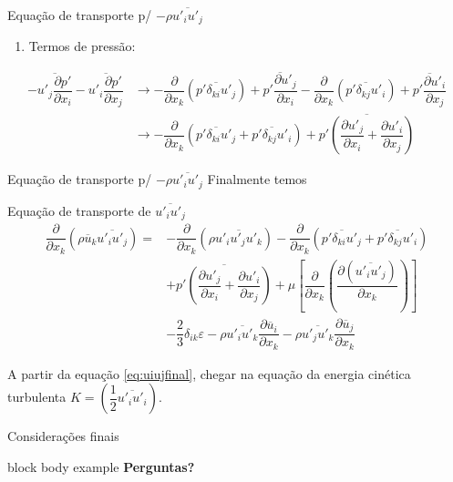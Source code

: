 \documentclass[10pt]{beamer}
\newcommand{\ddx}[2]{\dfrac{\partial #1}{\partial x_{#2}}}
\newcommand{\ddxp}[2]{\dfrac{\partial }{\partial x_{#2}}\left(#1\right)}
\newcommand{\m}[1]{\overline{#1}}
\begin{document}
\begin{frame}{Equação de transporte p/ $ -\rho \m{u'_i u'_j} $}
	\begin{enumerate}[$\bullet$]
		\item Termos de pressão:
	\end{enumerate}

	\begin{align*}
	- \m{u'_j\ddx{p'}{i}} - \m{u'_i\ddx{p'}{j}} 
	&\rightarrow - \ddxp{\m{p' \delta_{ki} u'_j}}{k} + \m{p'\ddx{u'_j}{i}} - \ddxp{\m{p' \delta_{kj} u'_i}}{k} + \m{p'\ddx{u'_i}{j}} \\
	&\rightarrow - \ddxp{\m{p' \delta_{ki} u'_j} + \m{p' \delta_{kj} u'_i}}{k} + \m{p'\left( \ddx{u'_j}{i} + \ddx{u'_i}{j} \right)}
	\end{align*}

\end{frame}

\begin{frame}{Equação de transporte p/ $ -\rho \m{u'_i u'_j} $}
	Finalmente temos
	
	\begin{block}{Equação de transporte de $ \m{u'_i u'_j} $}
		\begin{align}\label{eq:uiujfinal}
		\ddxp{\rho \m{u}_k \m{u'_i u'_j}}{k} = &- \ddxp{\rho \m{u'_iu'_ju'_k}}{k} - \ddxp{\m{p' \delta_{ki} u'_j} + \m{p' \delta_{kj} u'_i}}{k} \nonumber \\
		&+ \m{p'\left( \ddx{u'_j}{i} + \ddx{u'_i}{j} \right)} + \mu \left[ \ddxp{\ddx{(\m{u'_iu'_j})}{k}}{k} \right] \nonumber \\
		&- \dfrac{2}{3} \delta_{ik}\varepsilon
		- \rho \m{u'_i u'_k} \ddx{\m{u}_i}{k} - \rho \m{u'_j u'_k} \ddx{\m{u}_j}{k} 
		\end{align}
	\end{block}
	
	A partir da equação \ref{eq:uiujfinal}, chegar na equação da energia cinética turbulenta $ K = \left( \dfrac{1}{2} \m{u'_i u'_i} \right) $.
	
\end{frame}

\begin{frame}[b]{Considerações finais}
	\vfill
	\begin{beamercolorbox}[wd=\textwidth,rounded=true,shadow=true]{block body example}
		\vfill
		\centering \textbf{Perguntas?}
		\vspace*{10pt}
	\end{beamercolorbox}
	\vfill
	\doclicenseThis
\end{frame}
\end{document}
